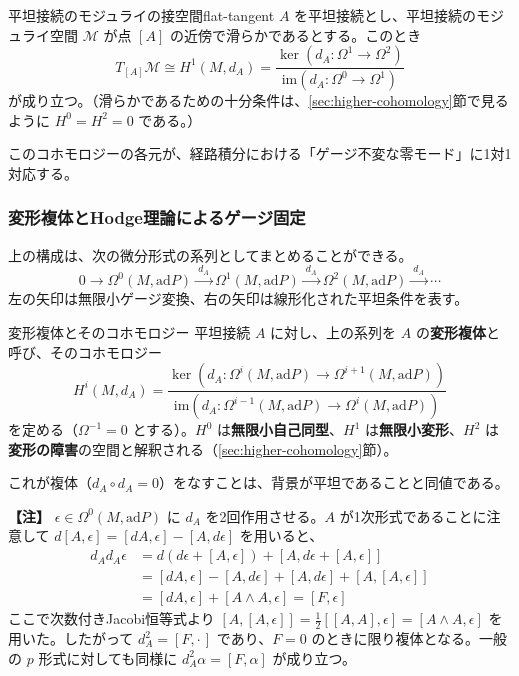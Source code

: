\documentclass[uplatex, dvipdfmx, book]{jsbook}
\let\origsubsubsection\subsubsection
\renewcommand{\subsection}{\origsubsubsection}
\renewcommand{\subsubsection}{\paragraph}
\newenvironment{note}{\vspace{1ex}\par\footnotesize\noindent\textbf{【注】}}{\par\vspace{1ex}}
\begin{document}
\begin{mythm}{平坦接続のモジュライの接空間}{flat-tangent}
$A$ を平坦接続とし、平坦接続のモジュライ空間 $\mathcal{M}$ が点 $[A]$ の近傍で滑らかであるとする。このとき
\begin{equation*}
    T_{[A]}\mathcal{M} \cong H^1(M, d_A) = \frac{\ker (d_A: \Omega^1 \to \Omega^2)}{\mathrm{im} (d_A: \Omega^0 \to \Omega^1)}
\end{equation*}
が成り立つ。（滑らかであるための十分条件は、\ref{sec:higher-cohomology}節で見るように $H^0 = H^2 = 0$ である。）
\end{mythm}

このコホモロジーの各元が、経路積分における「ゲージ不変な零モード」に1対1対応する。

\subsection{変形複体とHodge理論によるゲージ固定}

上の構成は、次の微分形式の系列としてまとめることができる。
\begin{equation}
    0 \longrightarrow \Omega^0(M, \mathrm{ad}P) \xrightarrow{\ d_A\ } \Omega^1(M, \mathrm{ad}P) \xrightarrow{\ d_A\ } \Omega^2(M, \mathrm{ad}P) \xrightarrow{\ d_A\ } \cdots
\end{equation}
左の矢印は無限小ゲージ変換、右の矢印は線形化された平坦条件を表す。

\begin{mydef}{変形複体とそのコホモロジー}{}
平坦接続 $A$ に対し、上の系列を $A$ の\textbf{変形複体}と呼び、そのコホモロジー
\begin{equation*}
    H^i(M, d_A) = \frac{\ker (d_A: \Omega^i(M, \mathrm{ad}P) \to \Omega^{i+1}(M, \mathrm{ad}P))}{\mathrm{im} (d_A: \Omega^{i-1}(M, \mathrm{ad}P) \to \Omega^{i}(M, \mathrm{ad}P))}
\end{equation*}
を定める（$\Omega^{-1} = 0$ とする）。$H^0$ は\textbf{無限小自己同型}、$H^1$ は\textbf{無限小変形}、$H^2$ は\textbf{変形の障害}の空間と解釈される（\ref{sec:higher-cohomology}節）。
\end{mydef}

これが複体（$d_A \circ d_A = 0$）をなすことは、背景が平坦であることと同値である。

\begin{note}
$\epsilon \in \Omega^0(M, \mathrm{ad}P)$ に $d_A$ を2回作用させる。$A$ が1次形式であることに注意して $d[A, \epsilon] = [dA, \epsilon] - [A, d\epsilon]$ を用いると、
\begin{align*}
d_A d_A \epsilon &= d(d\epsilon + [A, \epsilon]) + [A, d\epsilon + [A, \epsilon]] \\
&= [dA, \epsilon] - [A, d\epsilon] + [A, d\epsilon] + [A, [A, \epsilon]] \\
&= [dA, \epsilon] + [A \wedge A, \epsilon] = [F, \epsilon]
\end{align*}
ここで次数付きJacobi恒等式より $[A, [A, \epsilon]] = \frac{1}{2}[[A, A], \epsilon] = [A \wedge A, \epsilon]$ を用いた。したがって $d_A^2 = [F, \cdot\,]$ であり、$F = 0$ のときに限り複体となる。一般の $p$ 形式に対しても同様に $d_A^2 \alpha = [F, \alpha]$ が成り立つ。
\end{note}
\end{document}
